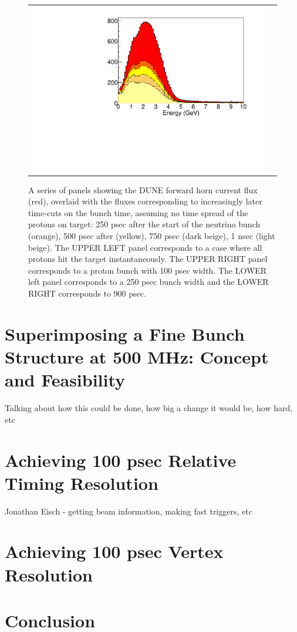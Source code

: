 \documentclass[preprint,12pt]{elsarticle}
\begin{document}
\begin{figure}[t]
\begin{center}
\begin{tabular}{c c}
			\includegraphics[width=0.49 \linewidth]{Figures/2018.10.10_LBNFtiming/DUNEbeam_900psecB.pdf}
			 \\			
			\end{tabular}
	\end{center}
	\caption{A series of panels showing the DUNE forward horn current flux (red), overlaid with the fluxes corresponding to increasingly later time-cuts on the bunch time, assuming no time spread of the protons on target: 250 psec after the start of the neutrino bunch (orange), 500 psec after (yellow), 750 psec (dark beige), 1 nsec (light beige). The UPPER LEFT panel corresponds to a case where all protons hit the target instantaneously. The UPPER RIGHT panel corresponds to a proton bunch with 100 psec width. The LOWER left panel corresponds to a 250 psec bunch width and the LOWER RIGHT corresponds to 900 psec.}
		\label{fig:anniedetector}
\end{figure}


\section{Superimposing a Fine Bunch Structure at 500 MHz: Concept and Feasibility}

Talking about how this could be done, how big a change it would be, how hard, etc

\section{Achieving 100 psec Relative Timing Resolution}

Jonathan Eisch - getting beam information, making fast triggers, etc

\section{Achieving 100 psec Vertex Resolution}


\section{Conclusion}
\end{document}
